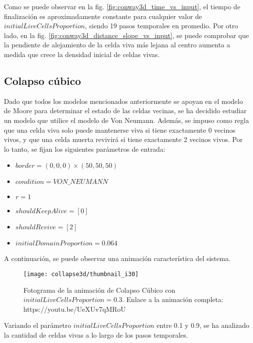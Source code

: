 Como se puede observar en la fig. \ref{fig:conway3d_time_vs_input}, el tiempo de finalización es
aproximadamente constante para cualquier valor de $initialLiveCellsProportion$, siendo 19 pasos temporales en promedio.
Por otro lado, en la fig. \ref{fig:conway3d_distance_slope_vs_input}, se puede comprobar que la pendiente de alejamiento
de la celda viva más lejana al centro aumenta a medida que crece la densidad inicial de celdas vivas.


\subsection{Colapso cúbico}\label{subsec:colapso-cubico}
Dado que todos los modelos mencionados anteriormente se apoyan en el modelo de Moore para determinar el estado
de las celdas vecinas, se ha decidido estudiar un modelo que utilice el modelo de Von Neumann.
Además, se impuso como regla que una celda viva solo puede mantenerse viva si tiene exactamente 0 vecinos vivos,
y que una celda muerta revivirá si tiene exactamente 2 vecinos vivos.
Por lo tanto, se fijan los siguientes parámetros de entrada:
\begin{itemize}
    \item $border = (0, 0, 0) \times (50, 50, 50)$
    \item $condition = VON\_NEUMANN$
    \item $r = 1$
    \item $shouldKeepAlive = [0]$
    \item $shouldRevive = [2]$
    \item $initialDomainProportion = 0.064$
\end{itemize}

A continuación, se puede observar una animación característica del sistema.

\begin{figure}[H]
    \centering
    \texttt{[image: collapse3d/thumbnail\_i30]}
    \caption{Fotograma de la animación de Colapso Cúbico con $initialLiveCellsProportion = 0.3$. Enlace a la animación completa: https://youtu.be/UeXUv7qMRoU}
    \label{fig:thumbnailcolapso3d_i50}
\end{figure}

Variando el parámetro $initialLiveCellsProportion$ entre 0.1 y 0.9, se ha analizado la cantidad de celdas vivas
a lo largo de los pasos temporales.


